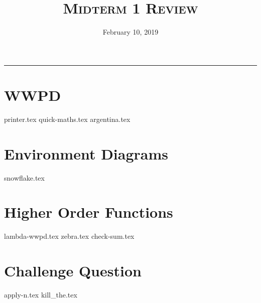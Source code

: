 \documentclass{exam}
\title{\textsc{Midterm 1 Review}}
\date{February 10, 2019}
\begin{document}
\maketitle
\rule{\textwidth}{0.15em}
\fontsize{12}{15}\selectfont


\section{WWPD}
\begin{questions}
{printer.tex}
{quick-maths.tex}
{argentina.tex}
\end{questions}

\newpage
\section{Environment Diagrams}
\begin{questions}
{snowflake.tex}
\end{questions}

\newpage
\section{Higher Order Functions}
\begin{questions}
{lambda-wwpd.tex}
{zebra.tex}
\newpage
{check-sum.tex}
\end{questions}


\section{Challenge Question}
\begin{questions}
{apply-n.tex}
{kill_the.tex}
\end{questions}
\end{document}
